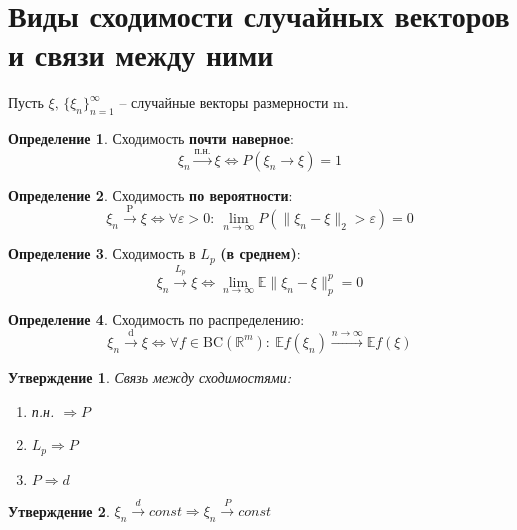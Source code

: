 \documentclass[a4paper,12pt]{article}
\theoremstyle{plain}
\newtheorem{proposition}{Утверждение}[section]
\theoremstyle{definition}
\newtheorem{definition}{Определение}[section]
\theoremstyle{remark}
\begin{document}
\tableofcontents
\newpage

\section{Виды сходимости случайных векторов и связи между ними}
Пусть $\xi,\, \{\xi_n\}_{n = 1}^\infty$ -- случайные векторы размерности m.
\begin{definition}
  Сходимость \textbf{почти наверное}:
  \[
    \xi_n \overset{\text{п.н.}}{\to} \xi \Leftrightarrow P(\xi_n \to \xi) = 1
  \]
\end{definition}

\begin{definition}
  Сходимость \textbf{по вероятности}:
  \[
    \xi_n \overset{\text{P}}{\to} \xi \Leftrightarrow \forall \varepsilon > 0 :\: \lim_{n \to \infty}P(\|\xi_n - \xi\|_2 > \varepsilon) = 0 
  \]
\end{definition}

\begin{definition}
  Сходимость в $L_p$ \textbf{(в среднем)}:
  \[
    \xi_n \overset{L_p}{\to} \xi \Leftrightarrow \lim_{n \to \infty} \mathbb{E}\|\xi_n - \xi\|_p^p = 0
  \]
\end{definition}

\begin{definition}
  Сходимость по распределению:
  \[
    \xi_n \overset{\text{d}}{\to} \xi \Leftrightarrow \forall f \in \text{BC}(\mathbb{R}^m) :\: \mathbb{E}f(\xi_n) \overset{n \to \infty}{\to} \mathbb{E}f(\xi)
  \]
\end{definition}

\begin{proposition}
  Связь между сходимостями:
  \begin{enumerate}
    \item п.н. $\Rightarrow P$
    \item $L_p \Rightarrow P$
    \item $P \Rightarrow d$
  \end{enumerate}
\end{proposition}

\begin{proposition}
  $\xi_n \overset{d}{\to} const \Rightarrow \xi_n \overset{P}{\to} const$
\end{proposition}
\end{document}
